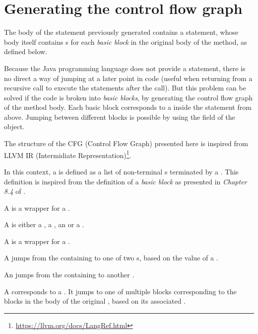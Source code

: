 \section{Generating the control flow graph}

The body of the  statement previously generated contains a  statement, whose body itself
contains s for each \textit{basic block} in the original body of the method, as defined below.

Because the Java programming language does not provide a  statement, there is no direct a way of jumping at
a later point in code (useful when returning from a recursive call to execute the statements after the call). But this
problem can be solved if the code is broken into \textit{basic blocks}, by generating the control flow graph of the
method body. Each basic block corresponds to a  inside the  statement from above. Jumping
between different blocks is possible by using the  field of the  object.

The structure of the CFG (Control Flow Graph)  presented here is inspired from LLVM
IR (Intermidiate Representation)\footnote{\url{https://llvm.org/docs/LangRef.html}}.

In this context, a  is defined as a list of non-terminal s terminated by a
. This definition is inspired from the definition of a \textit{basic block} as presented in
\textit{Chapter 8.4} of \cite{aho}.

A  is a wrapper for a .

A  is either a , a , an
 or a .

A  is a wrapper for a .

A  jumps from the containing  to one of two s, based on the
value of a .

An  jumps from the containing  to another .

A  corresponds to a . It jumps to one of multiple blocks corresponding to
the blocks in the body of the original , based on its associated .

